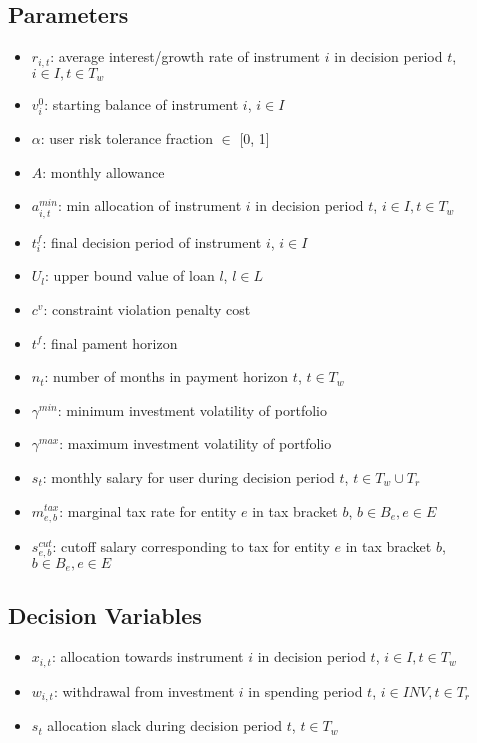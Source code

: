\documentclass[11pt]{article}
\begin{document}
\subsection{Parameters}
\begin{itemize}
    \item $r_{i, t}$: average interest/growth rate of instrument $i$ in decision period $t$, $i \in I, t \in T_w$
    \item $v^{0}_{i}$: starting balance of instrument $i$, $i \in I$
    \item $\alpha$: user risk tolerance fraction $\in$ [0, 1]
    \item $A$: monthly allowance
    \item $a^{min}_{i, t}$: min allocation of instrument $i$ in decision period $t$, $i \in I, t \in T_w$
    \item $t^{f}_{i}$: final decision period of instrument $i$, $i \in I$
    \item ${U}_{l}$: upper bound value of loan $l$, $l \in L$
    \item $c^{v}$: constraint violation penalty cost
    \item $t^{f}$: final pament horizon
    \item $n_{t}$: number of months in payment horizon $t$, $t \in T_w$
    \item $\gamma^{min}$: minimum investment volatility of portfolio
    \item $\gamma^{max}$: maximum investment volatility of portfolio
    \item $s_{t}$: monthly salary for user during decision period $t$, $t \in T_w \cup T_r$
    \item $m^{tax}_{e, b}$: marginal tax rate for entity $e$ in tax bracket $b$, $b \in B_e, e \in E$
    \item $s^{cut}_{e, b}$: cutoff salary corresponding to tax for entity $e$ in tax bracket $b$, $b \in B_e, e \in E$
\end{itemize}

\subsection{Decision Variables}
\begin{itemize}
    \item $x_{i, t}$: allocation towards instrument $i$ in decision period $t$, $i \in I, t \in T_w$
    \item $w_{i, t}$: withdrawal from investment $i$ in spending period $t$, $i \in INV, t \in T_r$
    \item $s_{t}$ allocation slack during decision period $t$, $t \in T_w$
\end{itemize}
\end{document}
